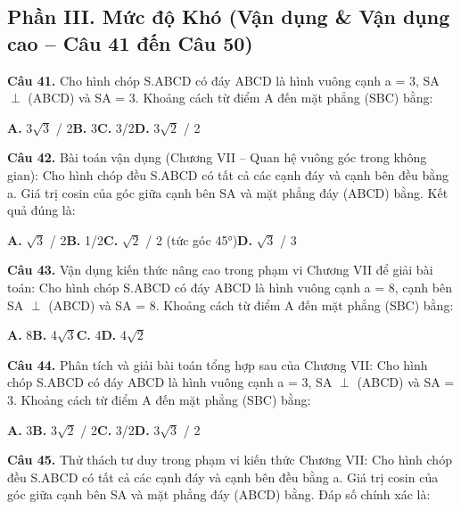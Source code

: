 \documentclass[11pt,a4paper]{article}
\begin{document}
\subsection*{\color{accent} Phần III. Mức độ Khó (Vận dụng \& Vận dụng cao -- Câu 41 đến Câu 50)}
\textbf{\color{primary} Câu 41.} Cho hình chóp S.ABCD có đáy ABCD là hình vuông cạnh a = 3, SA $\perp$ (ABCD) và SA = 3. Khoảng cách từ điểm A đến mặt phẳng (SBC) bằng:\par
\hspace*{1.5em}\textbf{A.} 3$\sqrt{3}$ / 2\quad\quad \textbf{B.} 3\quad\quad \textbf{C.} 3/2\quad\quad \textbf{D.} 3$\sqrt{2}$ / 2\par\vspace{2pt}
\textbf{\color{primary} Câu 42.} Bài toán vận dụng (Chương VII – Quan hệ vuông góc trong không gian): Cho hình chóp đều S.ABCD có tất cả các cạnh đáy và cạnh bên đều bằng a. Giá trị cosin của góc giữa cạnh bên SA và mặt phẳng đáy (ABCD) bằng. Kết quả đúng là:\par
\hspace*{1.5em}\textbf{A.} $\sqrt{3}$ / 2\quad\quad \textbf{B.} 1/2\quad\quad \textbf{C.} $\sqrt{2}$ / 2 (tức góc 45°)\quad\quad \textbf{D.} $\sqrt{3}$ / 3\par\vspace{2pt}
\textbf{\color{primary} Câu 43.} Vận dụng kiến thức nâng cao trong phạm vi Chương VII để giải bài toán: Cho hình chóp S.ABCD có đáy ABCD là hình vuông cạnh a = 8, cạnh bên SA $\perp$ (ABCD) và SA = 8. Khoảng cách từ điểm A đến mặt phẳng (SBC) bằng:\par
\hspace*{1.5em}\textbf{A.} 8\quad\quad \textbf{B.} 4$\sqrt{3}$\quad\quad \textbf{C.} 4\quad\quad \textbf{D.} 4$\sqrt{2}$\par\vspace{2pt}
\textbf{\color{primary} Câu 44.} Phân tích và giải bài toán tổng hợp sau của Chương VII: Cho hình chóp S.ABCD có đáy ABCD là hình vuông cạnh a = 3, SA $\perp$ (ABCD) và SA = 3. Khoảng cách từ điểm A đến mặt phẳng (SBC) bằng:\par
\hspace*{1.5em}\textbf{A.} 3\quad\quad \textbf{B.} 3$\sqrt{2}$ / 2\quad\quad \textbf{C.} 3/2\quad\quad \textbf{D.} 3$\sqrt{3}$ / 2\par\vspace{2pt}
\textbf{\color{primary} Câu 45.} Thử thách tư duy trong phạm vi kiến thức Chương VII: Cho hình chóp đều S.ABCD có tất cả các cạnh đáy và cạnh bên đều bằng a. Giá trị cosin của góc giữa cạnh bên SA và mặt phẳng đáy (ABCD) bằng. Đáp số chính xác là:\par
\end{document}
